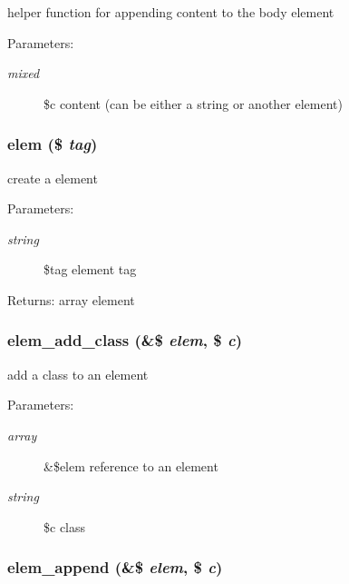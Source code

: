 helper function for appending content to the body element

\begin{Desc}
\item[Parameters:]
\begin{description}
\item[{\em mixed}]\$c content (can be either a string or another element) \end{description}
\end{Desc}
\hypertarget{html_8inc_8php_a7a1256f84f937f1656195d5ce7b8d91}{
\subsubsection[{elem}]{\setlength{\rightskip}{0pt plus 5cm}elem (\$ {\em tag})}}
\label{html_8inc_8php_a7a1256f84f937f1656195d5ce7b8d91}


create a element

\begin{Desc}
\item[Parameters:]
\begin{description}
\item[{\em string}]\$tag element tag \end{description}
\end{Desc}
\begin{Desc}
\item[Returns:]array element \end{Desc}
\hypertarget{html_8inc_8php_afa12d2b690751666e599fb052e19ca6}{
\subsubsection[{elem\_\-add\_\-class}]{\setlength{\rightskip}{0pt plus 5cm}elem\_\-add\_\-class (\&\$ {\em elem}, \/  \$ {\em c})}}
\label{html_8inc_8php_afa12d2b690751666e599fb052e19ca6}


add a class to an element

\begin{Desc}
\item[Parameters:]
\begin{description}
\item[{\em array}]\&\$elem reference to an element \item[{\em string}]\$c class \end{description}
\end{Desc}
\hypertarget{html_8inc_8php_ea37c451f5d55e2efbb2656e340c1dae}{
\subsubsection[{elem\_\-append}]{\setlength{\rightskip}{0pt plus 5cm}elem\_\-append (\&\$ {\em elem}, \/  \$ {\em c})}}
\label{html_8inc_8php_ea37c451f5d55e2efbb2656e340c1dae}


